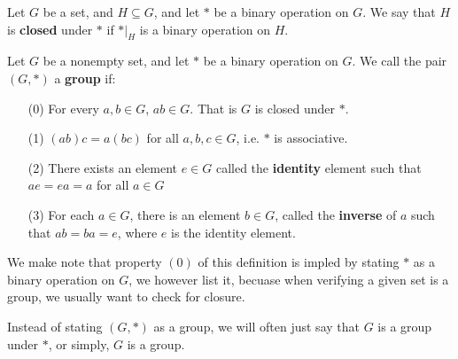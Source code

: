\begin{definition}
    Let $G$ be a set, and  $H \subseteq G$, and let  $\ast$ be a binary
    operation on  $G$. We say that  $H$ is \textbf{closed} under $\ast$ if
    $\ast|_H$ is a binary operation on  $H$.
\end{definition}

\begin{definition}
    Let $G$ be a nonempty set, and let  $\ast$ be a binary operation on $G$. We
    call the pair  $(G,\ast)$ a \textbf{group} if:
    \begin{enumerate}
        \item[(0)] For every $a,b \in G$,  $ab \in G$. That is  $G$ is closed
            under $\ast$.
        \item[(1)] $(ab)c=a(bc)$ for all $a,b,c \in G$, i.e. $\ast$ is
            associative.

        \item[(2)] There exists an element $e \in G$ called the
            \textbf{identity} element such that  $ae=ea=a$ for all  $a \in G$

        \item[(3)] For each $a \in G$, there is an element  $b \in G$, called
            the \textbf{inverse} of $a$ such that  $ab=ba=e$, where  $e$ is the
            identity element.
    \end{enumerate}
\end{definition}
\begin{remark}
    We make note that property $(0)$ of this definition is impled by stating
    $\ast$ as a binary operation on  $G$, we however list it, becuase when
    verifying a given set is a group, we usually want to check for closure.
\end{remark}
\begin{remark}
    Instead of stating $(G,\ast)$ as a group, we will often just say that $G$ is
    a group under  $\ast$, or simply,  $G$ is a group.
\end{remark}


